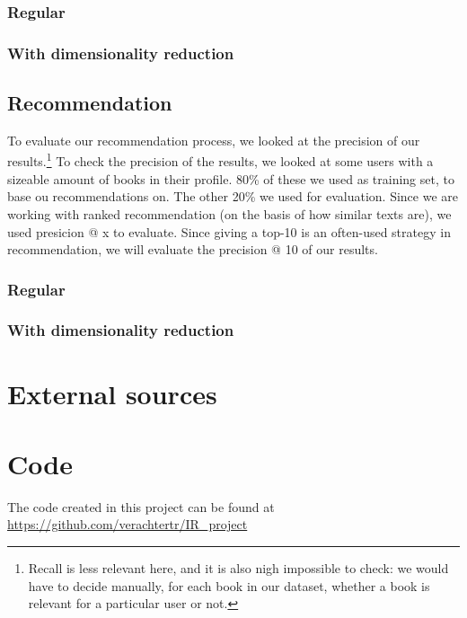 \documentclass[10pt,a4paper]{paper}
\begin{document}
\subsubsection{Regular}


\subsubsection{With dimensionality reduction}



\subsection{Recommendation}

To evaluate our recommendation process, we looked at the precision of our results.\footnote{Recall is less relevant here, and it is also nigh impossible to check: we would have to decide manually, for each book in our dataset, whether a book is relevant for a particular user or not.}
To check the precision of the results, we looked at some users with a sizeable amount of books in their profile. 80\% of these we used as training set, to base ou recommendations on. The other 20\% we used for evaluation. Since we are working with ranked recommendation (on the basis of how similar texts are), we used presicion @ x to evaluate. Since giving a top-10 is an often-used strategy in recommendation, we will evaluate the precision @ 10 of our results. %


\subsubsection{Regular}


\subsubsection{With dimensionality reduction}


\section{External sources}

\section{Code}
The code created in this project can be found at \url{https://github.com/verachtertr/IR_project}
\end{document}
